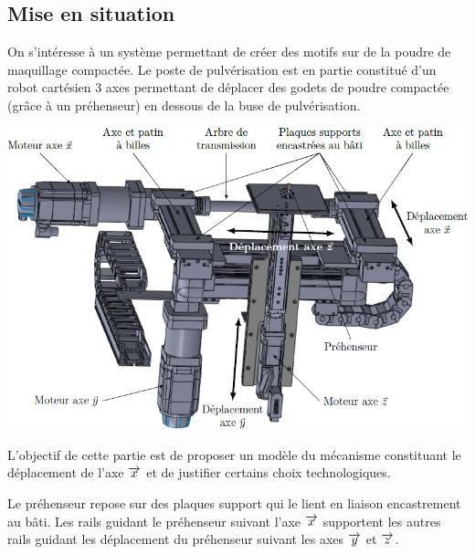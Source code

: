 \documentclass[10pt,fleqn]{article} %
\begin{document}

\vspace{4.5cm}
\pagestyle{fancy}
\thispagestyle{plain}


\def\columnseprulecolor{\color{ocre}}
\setlength{\columnseprule}{0.4pt} 

\begin{multicols}{2}
\section*{Mise en situation}
\ifprof
\else
On s'intéresse à un système permettant de créer des motifs sur de la poudre de maquillage compactée. Le poste de pulvérisation est en partie constitué d'un robot cartésien 3 axes permettant de déplacer des godets de poudre compactée (grâce à un préhenseur) en dessous de la buse de pulvérisation. 

\begin{center}
\includegraphics[width=\linewidth]{images/fig_02}
\end{center}

\fi

\begin{obj}
L’objectif de cette partie est de proposer un modèle du mécanisme constituant le déplacement de l’axe $\overrightarrow{x}$ et de justifier certains choix technologiques.
\end{obj}

\ifprof
\else
Le préhenseur repose sur des plaques support qui le lient en liaison encastrement au bâti. Les rails
guidant le préhenseur suivant l’axe $\overrightarrow{x}$ supportent les autres rails guidant les déplacement du préhenseur suivant les axes $\overrightarrow{y}$ et $\overrightarrow{z}$.


\end{multicols}
\end{document}

